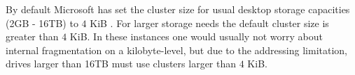 By default Microsoft has set the cluster size for usual desktop storage capacities (2GB - 16TB) to $4$ KiB \cite{microsoftinc:2018:DCS}. For larger storage needs the default cluster size is greater than $4$ KiB. In these instances one would usually not worry about internal fragmentation on a kilobyte-level, but due to the addressing limitation, drives larger than 16TB must use clusters larger than $4$ KiB.

